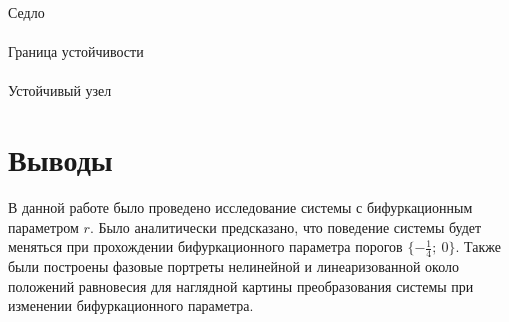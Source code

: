 \documentclass[12pt]{article}
\begin{document}
\begin{center}
    Седло \\
    \downarrow \\
    Граница устойчивости \\
    \downarrow \\
    Устойчивый узел \\
\end{center}

\section*{Выводы}
В данной работе было проведено исследование системы с бифуркационным параметром $r$. Было аналитически предсказано, что поведение системы будет меняться при прохождении бифуркационного параметра порогов $\{-\frac{1}{4}; \ 0\}$. Также были построены фазовые портреты нелинейной и линеаризованной около положений равновесия для наглядной картины преобразования системы при изменении бифуркационного параметра.
\end{document}
